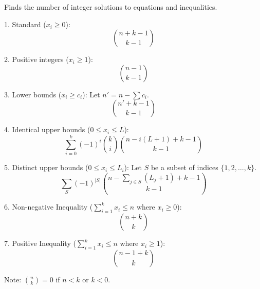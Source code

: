 
Finds the number of integer solutions to equations and inequalities.

1. Standard ($x_i \ge 0$):
$$\binom{n + k - 1}{k - 1}$$

2. Positive integers ($x_i \ge 1$):
$$\binom{n - 1}{k - 1}$$

3. Lower bounds ($x_i \ge c_i$):
Let $n' = n - \sum c_i$. 
$$\binom{n' + k - 1}{k - 1}$$

4. Identical upper bounds ($0 \le x_i \le L$):
$$\sum_{i=0}^{k} (-1)^i \binom{k}{i} \binom{n - i(L + 1) + k - 1}{k - 1}$$

5. Distinct upper bounds ($0 \le x_i \le L_i$):
Let $S$ be a subset of indices $\{1, 2, \dots, k\}$.
$$\sum_{S} (-1)^{|S|} \binom{n - \sum_{j \in S} (L_j + 1) + k - 1}{k - 1}$$

6. Non-negative Inequality ($\sum_{i=1}^k x_i \le n$ where $x_i \ge 0$):
$$\binom{n + k}{k}$$

7. Positive Inequality ($\sum_{i=1}^k x_i \le n$ where $x_i \ge 1$):
$$\binom{n - 1 + k}{k}$$

Note: $\binom{n}{k} = 0$ if $n < k$ or $k < 0$.

